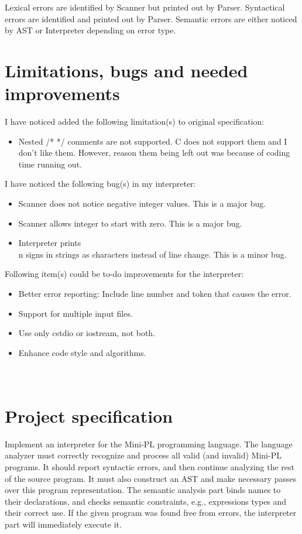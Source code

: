 \documentclass[english,11pt,twoside,a4paper]{article}
\begin{document}
Lexical errors are identified by Scanner but printed out by Parser. Syntactical errors are identified and printed out by Parser. Semantic errors are either noticed by AST or Interpreter depending on error type. 

\section{Limitations, bugs and needed improvements}

I have noticed added the following limitation(s) to original specification:
\begin{itemize}
	\item Nested /* */ comments are not supported. C does not support them and I don't like them. However, reason them being left out was because of coding time running out.
\end{itemize}

I have noticed the following bug(s) in my interpreter:
\begin{itemize}
	\item Scanner does not notice negative integer values. This is a major bug.
	\item Scanner allows integer to start with zero. This is a major bug.
	\item Interpreter prints \\n signs in strings as characters instead of line change. This is a minor bug.
\end{itemize}

Following item(s) could be to-do improvements for the interpreter:
\begin{itemize}
	\item Better error reporting: Include line number and token that causes the error.
	\item Support for multiple input files.
	\item Use only cstdio or iostream, not both.
	\item Enhance code style and algorithms.
\end{itemize}

\newpage
\appendix
\section{\\Project specification} \label{App:ProjectSpec}

Implement an interpreter for the Mini-PL programming language. The language analyzer must correctly recognize and process all valid (and invalid) Mini-PL programs. It should report syntactic errors, and then continue analyzing the rest of the source program. It must also construct an AST and make necessary passes over this program representation. The semantic analysis part binds names to their declarations, and checks semantic constraints, e.g., expressions types and their correct use. If the given program was found free from errors, the interpreter part will immediately execute it.
\end{document}
